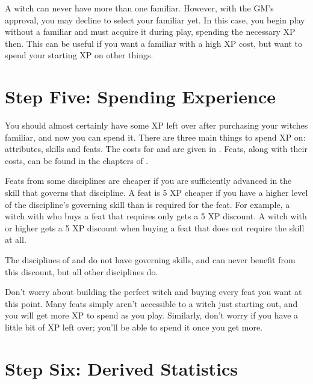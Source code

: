 A witch can never have more than one familiar.
However, with the GM's approval, you may decline to select your familiar yet.
In this case, you begin play without a familiar and must acquire it during play, spending the necessary XP then.
This can be useful if you want a familiar with a high XP cost, but want to spend your starting XP on other things.

\section{Step Five: Spending Experience}

You should almost certainly have some XP left over after purchasing your witches familiar, and now you can spend it.
There are three main things to spend XP on: attributes, skills and feats.
The costs for  and  are given in .
Feats, along with their costs, can be found in the chapters of .

Feats from some disciplines are cheaper if you are sufficiently advanced in the skill that governs that discipline.
A feat is 5 XP cheaper if you have a higher level of the discipline's governing skill than is required for the feat.
For example, a witch with  who buys a  feat that requires only  gets a 5 XP discount.
A witch with  or higher gets a 5 XP discount when buying a  feat that does not require the  skill at all.

The disciplines of  and  do not have governing skills, and can never benefit from this discount, but all other disciplines do.

Don't worry about building the perfect witch and buying every feat you want at this point.
Many feats simply aren't accessible to a witch just starting out, and you will get more XP to spend as you play.
Similarly, don't worry if you have a little bit of XP left over; you'll be able to spend it once you get more.

\section{Step Six: Derived Statistics}

